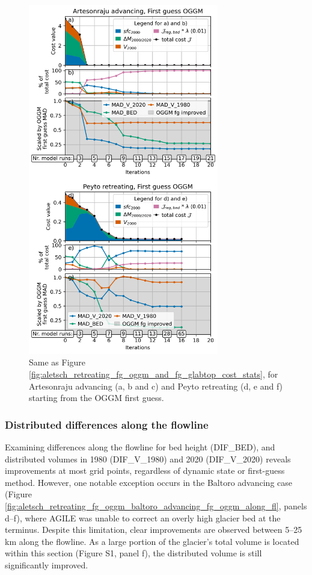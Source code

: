 \documentclass[journal abbreviation, manuscript]{copernicus}
\begin{document}
\begin{figure}
    \centering
    \includegraphics[width=8.3cm]{fig08.png}
    \caption{Same as Figure \ref{fig:aletsch_retreating_fg_oggm_and_fg_glabtop_cost_stats}, for Artesonraju advancing (a, b and c) and Peyto retreating (d, e and f) starting from the OGGM first guess.}
    \label{fig:aletsch_eq_peyto_re_fg_oggm}
\end{figure}

\subsubsection{Distributed differences along the flowline}
\label{subsec:Diff_along_fl_all_glacier_geometries_dynamic_states}

Examining differences along the flowline for bed height (DIF\_BED), and distributed volumes in 1980 (DIF\_V\_1980) and 2020 (DIF\_V\_2020) reveals improvements at most grid points, regardless of dynamic state or first-guess method. However, one notable exception occurs in the Baltoro advancing case (Figure \ref{fig:aletsch_retreating_fg_oggm_baltoro_advancing_fg_oggm_along_fl}, panels d–f), where AGILE was unable to correct an overly high glacier bed at the terminus. Despite this limitation, clear improvements are observed between 5–25 km along the flowline. As a large portion of the glacier’s total volume is located within this section (Figure S1, panel f), the distributed volume is still significantly improved.
\end{document}
